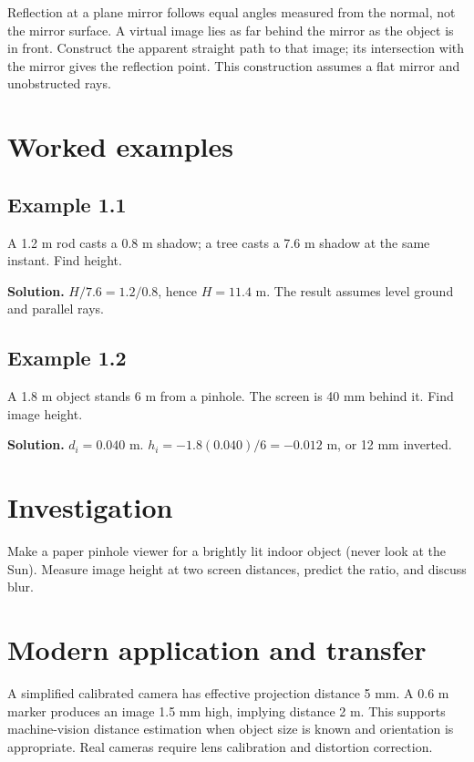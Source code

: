 \documentclass[11pt,a4paper,openany]{book}
\begin{document}
Reflection at a plane mirror follows equal angles measured from the normal, not the mirror surface. A virtual image lies as far behind the mirror as the object is in front. Construct the apparent straight path to that image; its intersection with the mirror gives the reflection point. This construction assumes a flat mirror and unobstructed rays.
\begin{center}
\end{center}
\section{Worked examples}
\subsection*{Example 1.1}
A 1.2 m rod casts a 0.8 m shadow; a tree casts a 7.6 m shadow at the same instant. Find height.

\textbf{Solution.} $H/7.6=1.2/0.8$, hence $H=11.4$ m. The result assumes level ground and parallel rays.
\subsection*{Example 1.2}
A 1.8 m object stands 6 m from a pinhole. The screen is 40 mm behind it. Find image height.

\textbf{Solution.} $d_i=0.040$ m. $h_i=-1.8(0.040)/6=-0.012$ m, or 12 mm inverted.
\section{Investigation}
Make a paper pinhole viewer for a brightly lit indoor object (never look at the Sun). Measure image height at two screen distances, predict the ratio, and discuss blur.
\section{Modern application and transfer}
A simplified calibrated camera has effective projection distance 5 mm. A 0.6 m marker produces an image 1.5 mm high, implying distance 2 m. This supports machine-vision distance estimation when object size is known and orientation is appropriate. Real cameras require lens calibration and distortion correction.
\end{document}
